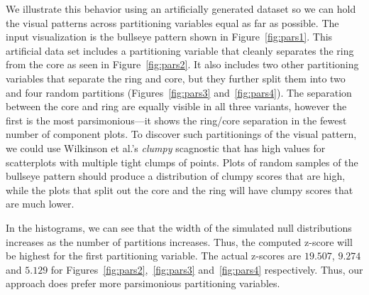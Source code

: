 We illustrate this behavior using an artificially generated dataset so we can hold the visual patterns across partitioning variables equal as far as possible. The input visualization is the bullseye pattern shown in Figure~\ref{fig:pars1}. This artificial data set includes a partitioning variable that cleanly separates the ring from the core as seen in Figure~\ref{fig:pars2}. It also includes two other partitioning variables that separate the ring and core, but they further split them into two and four random partitions (Figures~\ref{fig:pars3} and~\ref{fig:pars4}). The separation between the core and ring are equally visible in all three variants, however the first is the most parsimonious---it shows the ring/core separation in the fewest number of component plots. 
To discover such partitionings of the visual pattern, we could use Wilkinson et al.'s \emph{clumpy} scagnostic that has high values for scatterplots with multiple tight clumps of points. Plots of random samples of the bullseye pattern should produce a distribution of clumpy scores that are high, while the plots that split out the core and the ring will have clumpy scores that are much lower.

In the histograms, we can see that the width of the simulated null distributions increases as the number of partitions increases. Thus, the computed z-score will be highest for the first partitioning variable. The actual z-scores are $19.507$, $9.274$ and $5.129$ for Figures~\ref{fig:pars2},~\ref{fig:pars3} and~\ref{fig:pars4} respectively. Thus, our approach does prefer more parsimonious partitioning variables.

